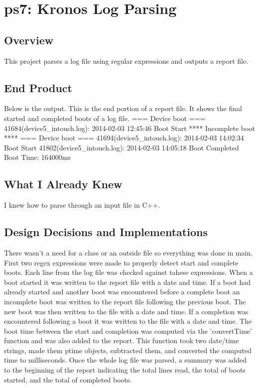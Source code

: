\section{ps7: Kronos Log Parsing}\label{sec:ps7}

\subsection{Overview}\label{sec:ps7:overview} %

This project parses a log file using regular expressions and outputs a report file.

\subsection{End Product}\label{sec:ps7:accomplish} %

Below is the output.
This is the end portion of a report file.
It shows the final started and completed boots of a log file.
\bigskip
=== Device boot ===
41684(device5\_intouch.log): 2014-02-03 12:45:46 Boot Start
**** Incomplete boot **** 
\bigskip
=== Device boot ===
41694(device5\_intouch.log): 2014-02-03 14:02:34 Boot Start
41802(device5\_intouch.log): 2014-02-03 14:05:18 Boot Completed
	Boot Time: 164000ms

\subsection{What I Already Knew}\label{sec:ps7:knew} %

I knew how to parse through an input file in C++.

\subsection{Design Decisions and Implementations}\label{sec:ps7:decisions} %

There wasn't a need for a class or an outside file so everything was done in main.
First two regex expressions were made to properly detect start and complete boots.
Each line from the log file was checked against tahese expressions.
When a boot started it was written to the report file with a date and time.
If a boot had already started and another boot was encountered before a complete boot an incomplete boot was written to the report file following the previous boot. 
The new boot was then written to the file with a date and time.
If a completion was encountered following a boot it was written to the file with a date and time.
The boot time between the start and completion was computed via the 'convertTime' function and was also added to the report.
This function took two date/time strings, made them ptime objects, subtracted them, and converted the computed time to milliseconds.
Once the whole log file was parsed, a summary was added to the beginning of the report indicating the total lines read, the total of boots started, and the total of completed boots.

